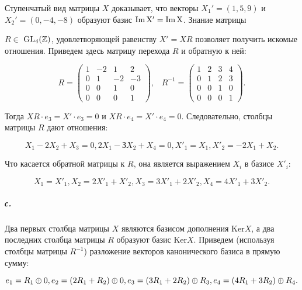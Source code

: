 {\noindent Ступенчатый вид матрицы $X$ доказывает, что векторы $X_{1}' = (1,5,9)$
и $X_{2}' = (0,-4,-8)$ образуют базис $\rm{Im}\,{X'} = \rm{Im}\,{X}$. Знание матрицы





\noindent $R \in$ $\rm{GL_{4}}(\mathbb {Z})$, удовлетворяющей равенству $X' = XR$ позволяет получить
искомые отношения. Приведем здесь матрицу перехода $R$ и обратную
к ней:

\begin{equation*}
R = {\begin{pmatrix} 1  & -2  &  1  &  2 \\
                     0  &  1  & -2  & -3 \\
                     0  &  0  &  1  &  0 \\
                     0  &  0  &  0  &  1 
     \end{pmatrix}},\;\;\;
R^{-1} = {\begin{pmatrix} 1 & 2 & 3 & 4 \\ 0 & 1 & 2 & 3 \\ 0 & 0 & 1 & 0 \\ 0 & 0 & 0 & 1 \end{pmatrix}}.
\end{equation*}

\noindent Тогда $XR \cdot e_3 = X' \cdot e_3 = 0$ и $XR \cdot e_4 = X' \cdot e_4 = 0$. Следовательно,
столбцы матрицы $R$ дают отношения:

\begin{equation*}
X_1 - 2X_2 + X_3 = 0, 2X_1 - ЗX_2 + X_4 = 0, X'_{1} = X_1, X'_{2} = -2X_1 + X_2.
\end{equation*}

\noindent Что касается обратной матрицы к $R$, она является выражением $X_i$ в
базисе $X'_{i}$:

\begin{equation*}
X_1 = X'_{1}, X_2 = 2X'_{1} + X'_{2}, X_3 = 3X'_{1} + 2 X'_{2}, X_4 = 4X'_{1} + 3X'_{2}.
\end{equation*}

\subparagraph{с.} Два первых столбца матрицы $X$ являются базисом дополнения
Ker{$X$}, а два последних столбца матрицы $R$ образуют базис Ker{$X$}. Приведем (используя столбцы матрицы $R^{-1}$) разложение векторов канонического базиса в прямую сумму:

\begin{equation*}
e_1 = R_1 \oplus 0, e_2 = (2R_1 + R_2) \oplus 0, \\
e_3 = (3R_1 + 2R_2) \oplus R_{3}, e_4 = (4R_1 + 3R_2) \oplus R_4.
\end{equation*}

}
